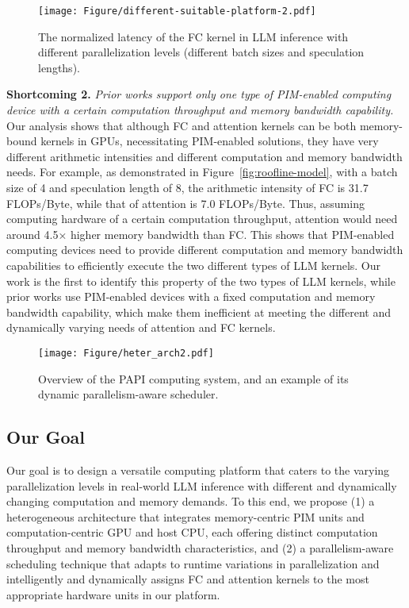 \begin{figure}[H]

\centering
\texttt{[image: Figure/different-suitable-platform-2.pdf]}
\caption{The normalized latency of the FC kernel in LLM inference with different parallelization levels (different batch sizes and speculation lengths).}
\label{fig:different-suitable-platforms}

\end{figure}

\noindent\textbf{Shortcoming 2.} \textit{Prior works support only one type of PIM-enabled computing device with a certain computation throughput and memory bandwidth capability.} Our analysis shows that although FC and attention kernels can be both memory-bound kernels in GPUs, necessitating PIM-enabled solutions, they have very different arithmetic intensities and different computation and memory bandwidth needs. For example, as demonstrated in Figure~\ref{fig:roofline-model}, with a batch size of 4 and speculation length of 8, the arithmetic intensity of FC is 31.7 FLOPs/Byte, while that of attention is 7.0 FLOPs/Byte. Thus, assuming computing hardware of a certain computation throughput, attention would need around 4.5× higher memory bandwidth than FC. This shows that PIM-enabled computing devices need to provide different computation and memory bandwidth capabilities to efficiently execute the two different types of LLM kernels.
Our work is the first to identify this property of the two types of LLM kernels, while prior works use PIM-enabled devices with a fixed computation and memory bandwidth capability, which make them inefficient at meeting the different and dynamically varying needs of attention and FC kernels. 


\begin{figure*}[bp]

\centering
\texttt{[image: Figure/heter\_arch2.pdf]}
\caption{Overview of the PAPI computing system, and an example of its dynamic parallelism-aware scheduler.}
\label{fig:heter_arch}

\end{figure*} 

\subsection{Our Goal}
Our goal is to design a versatile computing platform that caters to the varying parallelization levels in real-world LLM inference with different and dynamically changing computation and memory demands. To this end, we propose (1) a heterogeneous architecture that integrates memory-centric PIM units and computation-centric GPU and host CPU, each offering distinct computation throughput and memory bandwidth characteristics, and (2) a parallelism-aware scheduling technique that adapts to runtime variations in parallelization and intelligently and dynamically assigns FC and attention kernels to the most appropriate hardware units in our platform.



